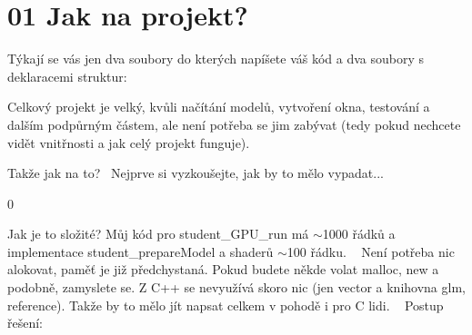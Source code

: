 \chapter{01 Jak na projekt?}
\hypertarget{p01_jakNaTo}{}\label{p01_jakNaTo}


Týkají se vás jen dva soubory do kterých napíšete váš kód a dva soubory s deklaracemi struktur\+:
\begin{DoxyItemize}
\item {}
\item {}
\end{DoxyItemize}

Celkový projekt je velký, kvůli načítání modelů, vytvoření okna, testování a dalším podpůrným částem, ale není potřeba se jim zabývat (tedy pokud nechcete vidět vnitřnosti a jak celý projekt funguje).

Takže jak na to?~\newline
 Nejprve si vyzkoušejte, jak by to mělo vypadat...


\begin{DoxyCode}{0}
\DoxyCodeLine{}

\end{DoxyCode}


Jak je to složité? Můj kód pro student\+\_\+\+GPU\+\_\+run má \texorpdfstring{$\sim$}{\string~}1000 řádků a implementace student\+\_\+prepare\+Model a shaderů \texorpdfstring{$\sim$}{\string~}100 řádku. ~\newline
 Není potřeba nic alokovat, paměť je již předchystaná. Pokud budete někde volat malloc, new a podobně, zamyslete se. Z C++ se nevyužívá skoro nic (jen vector a knihovna glm, reference). Takže by to mělo jít napsat celkem v pohodě i pro C lidi. ~\newline
 Postup řešení\+:


